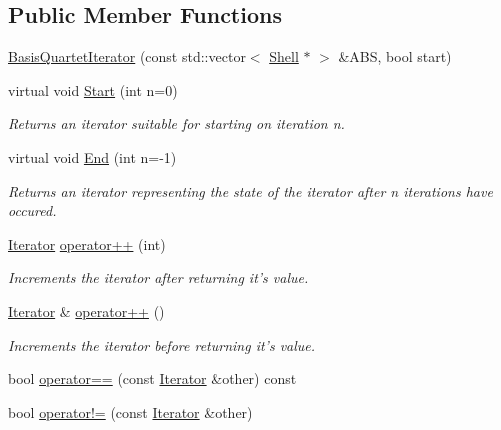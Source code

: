 \subsection*{Public Member Functions}
\begin{DoxyCompactItemize}
\item 
\hyperlink{classJKBuilder_1_1BasisQuartetIterator_afac9e1e5415c1d0b7359faa353f6b86d}{BasisQuartetIterator} (const std::vector$<$ \hyperlink{classJKBuilder_1_1Shell}{Shell} $\ast$ $>$ \&ABS, bool start)
\item 
virtual void \hyperlink{classJKBuilder_1_1Iterator_a34ca36a99b20ae3170babadaffe51ed2}{Start} (int n=0)
\begin{DoxyCompactList}\small\item\em Returns an iterator suitable for starting on iteration n. \item\end{DoxyCompactList}\item 
virtual void \hyperlink{classJKBuilder_1_1Iterator_a5f692b73d2e160450f4617bb75825e11}{End} (int n=-\/1)
\begin{DoxyCompactList}\small\item\em Returns an iterator representing the state of the iterator after n iterations have occured. \item\end{DoxyCompactList}\item 
\hyperlink{classJKBuilder_1_1Iterator}{Iterator} \hyperlink{classJKBuilder_1_1Iterator_ac1702aedba13b4112b891b58dfd78eba}{operator++} (int)
\begin{DoxyCompactList}\small\item\em Increments the iterator after returning it's value. \item\end{DoxyCompactList}\item 
\hyperlink{classJKBuilder_1_1Iterator}{Iterator} \& \hyperlink{classJKBuilder_1_1Iterator_ae1f21c74128a5ef5d1b9de72ceb09be8}{operator++} ()
\begin{DoxyCompactList}\small\item\em Increments the iterator before returning it's value. \item\end{DoxyCompactList}\item 
bool \hyperlink{classJKBuilder_1_1Iterator_a1ea001976a5bc8ae8dc365e2a912b59a}{operator==} (const \hyperlink{classJKBuilder_1_1Iterator}{Iterator} \&other) const 
\item 
bool \hyperlink{classJKBuilder_1_1Iterator_a8c06af8ae0d9d1614ae9f81629275926}{operator!=} (const \hyperlink{classJKBuilder_1_1Iterator}{Iterator} \&other)

\end{DoxyCompactItemize}
